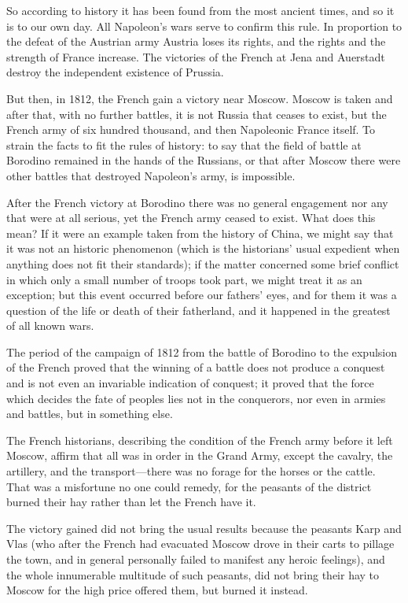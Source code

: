 So according to history it has been found from the most ancient
times, and so it is to our own day. All Napoleon's wars serve to
confirm this rule. In proportion to the defeat of the Austrian
army Austria loses its rights, and the rights and the strength of
France increase. The victories of the French at Jena and
Auerstadt destroy the independent existence of Prussia.

But then, in 1812, the French gain a victory near Moscow. Moscow
is taken and after that, with no further battles, it is not
Russia that ceases to exist, but the French army of six hundred
thousand, and then Napoleonic France itself. To strain the facts
to fit the rules of history: to say that the field of battle at
Borodino remained in the hands of the Russians, or that after
Moscow there were other battles that destroyed Napoleon's army,
is impossible.

After the French victory at Borodino there was no general
engagement nor any that were at all serious, yet the French army
ceased to exist. What does this mean? If it were an example taken
from the history of China, we might say that it was not an
historic phenomenon (which is the historians' usual expedient
when anything does not fit their standards); if the matter
concerned some brief conflict in which only a small number of
troops took part, we might treat it as an exception; but this
event occurred before our fathers' eyes, and for them it was a
question of the life or death of their fatherland, and it
happened in the greatest of all known wars.

The period of the campaign of 1812 from the battle of Borodino to
the expulsion of the French proved that the winning of a battle
does not produce a conquest and is not even an invariable
indication of conquest; it proved that the force which decides
the fate of peoples lies not in the conquerors, nor even in
armies and battles, but in something else.

The French historians, describing the condition of the French
army before it left Moscow, affirm that all was in order in the
Grand Army, except the cavalry, the artillery, and the
transport---there was no forage for the horses or the
cattle. That was a misfortune no one could remedy, for the
peasants of the district burned their hay rather than let the
French have it.

The victory gained did not bring the usual results because the
peasants Karp and Vlas (who after the French had evacuated Moscow
drove in their carts to pillage the town, and in general
personally failed to manifest any heroic feelings), and the whole
innumerable multitude of such peasants, did not bring their hay
to Moscow for the high price offered them, but burned it instead.

